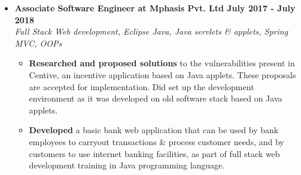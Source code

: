 \documentclass[a4paper,11pt]{article}
\newcommand{\isep}{-2 pt}
\newcommand{\spsep}{-0.75cm}
\begin{document}
\begin{itemize}
	\item \textbf{Associate Software Engineer at Mphasis Pvt. Ltd \hfill July 2017 - July 2018} \\
	\emph{Full Stack Web development, Eclipse \hfill Java, Java servlets \& applets, Spring MVC, OOPs} \\[\spsep]
		\begin{itemize} \itemsep \isep
		\item \textbf{Researched and proposed solutions} to the vulnerabilities present in Centive, an incentive application based on Java applets. These proposals are accepted for implementation. Did set up the development environment as it was developed on old software stack based on Java applets.
		\item \textbf{Developed} a basic bank web application that can be used by bank employees to carryout transactions \& process customer needs, and by customers to use internet banking facilities, as part of full stack web development training in Java programming language.
		\end{itemize}
\end{itemize}
\end{document}
